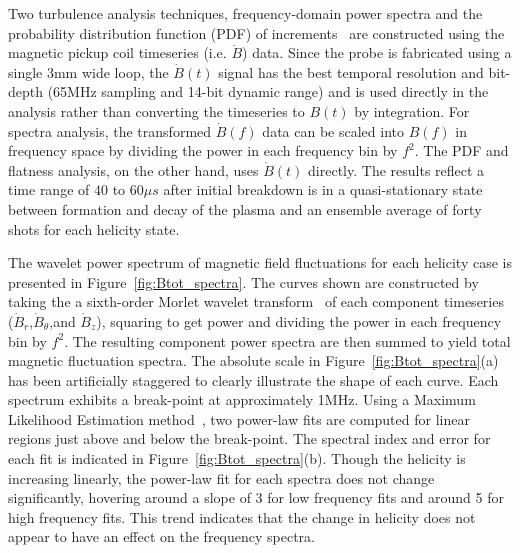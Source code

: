 \documentclass[aps,prl,amsmath,amssymb,reprint,superscriptaddress]{revtex4-1} %
\begin{document}
Two turbulence analysis techniques, frequency-domain power spectra and the probability distribution function (PDF) of increments~\cite{Greco09} are constructed using the magnetic pickup coil timeseries (i.e. $\dot{B}$) data. Since the probe is fabricated using a single 3mm wide loop, the $\dot{B}(t)$ signal has the best temporal resolution and bit-depth (65MHz sampling and 14-bit dynamic range) and is used directly in the analysis rather than converting the timeseries to $B(t)$ by integration. For spectra analysis, the transformed $\dot{B}(f)$ data can be scaled into $B(f)$ in frequency space by dividing the power in each frequency bin by $f^{2}$. The PDF and flatness analysis, on the other hand, uses $\dot{B}(t)$ directly. The results reflect a time range of $40$ to $60 \mu s$ after initial breakdown is in a quasi-stationary state between formation and decay of the plasma and an ensemble average of forty shots for each helicity state.

The wavelet power spectrum of magnetic field fluctuations for each helicity case is presented in Figure~\ref{fig:Btot_spectra}. The curves shown are constructed by taking the a sixth-order Morlet wavelet transform~\cite{torrence98} of each component timeseries ($\dot{B}_r$,$\dot{B}_{\theta}$,and $\dot{B}_{z}$), squaring to get power and dividing the power in each frequency bin by $f^{2}$. The resulting component power spectra are then summed to yield total magnetic fluctuation spectra. The absolute scale in Figure~\ref{fig:Btot_spectra}(a) has been artificially staggered to clearly illustrate the shape of each curve. Each spectrum exhibits a break-point at approximately 1MHz. Using a Maximum Likelihood Estimation method~\cite{clauset09}, two power-law fits are computed for linear regions just above and below the break-point. The spectral index and error for each fit is indicated in Figure~\ref{fig:Btot_spectra}(b). Though the helicity is increasing linearly, the power-law fit for each spectra does not change significantly, hovering around a slope of 3 for low frequency fits and around 5 for high frequency fits. This trend indicates that the change in helicity does not appear to have an effect on the frequency spectra.
\end{document}
